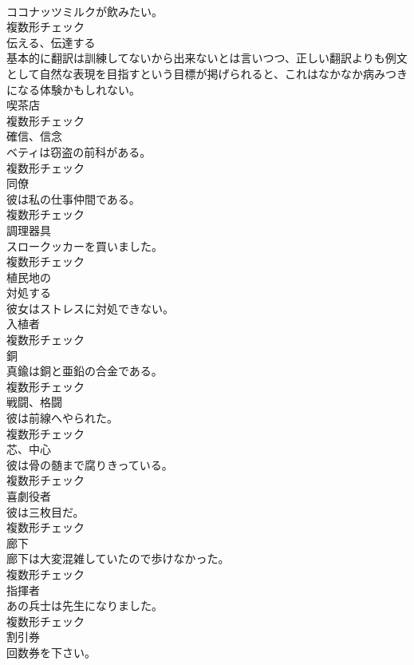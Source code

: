 \documentclass[8pt]{extreport}
\begin{document}
\begin{CJK}{UTF8}{min}
\\	ココナッツミルクが飲みたい。	
\\	複数形チェック
\\	[動詞]	伝える、伝達する	
\\	基本的に翻訳は訓練してないから出来ないとは言いつつ、正しい翻訳よりも例文として自然な表現を目指すという目標が掲げられると、これはなかなか病みつきになる体験かもしれない。	
\\	[名詞]	喫茶店	
\\	複数形チェック
\\	[名詞]	確信、信念	
\\	ベティは窃盗の前科がある。	
\\	複数形チェック
\\	[名詞]	同僚	
\\	彼は私の仕事仲間である。	
\\	複数形チェック
\\	[名詞]	調理器具	
\\	スロークッカーを買いました。	
\\	複数形チェック
\\	[形容詞]	植⺠地の	
\\	[動詞]	対処する	
\\	彼女はストレスに対処できない。	
\\	[名詞]	入植者	
\\	複数形チェック
\\	[名詞]	銅	
\\	真鍮は銅と亜鉛の合金である。	
\\	複数形チェック
\\	[名詞]	戦闘、格闘	
\\	彼は前線へやられた。	
\\	複数形チェック
\\	[名詞]	芯、中心	
\\	彼は骨の髄まで腐りきっている。	
\\	複数形チェック
\\	[名詞]	喜劇役者	
\\	彼は三枚目だ。	
\\	複数形チェック
\\	[名詞]	廊下	
\\	廊下は大変混雑していたので歩けなかった。	
\\	複数形チェック
\\	[名詞]	指揮者	
\\	あの兵士は先生になりました。	
\\	複数形チェック
\\	[名詞]	割引券	
\\	回数券を下さい。	

\end{CJK}
\end{document}

